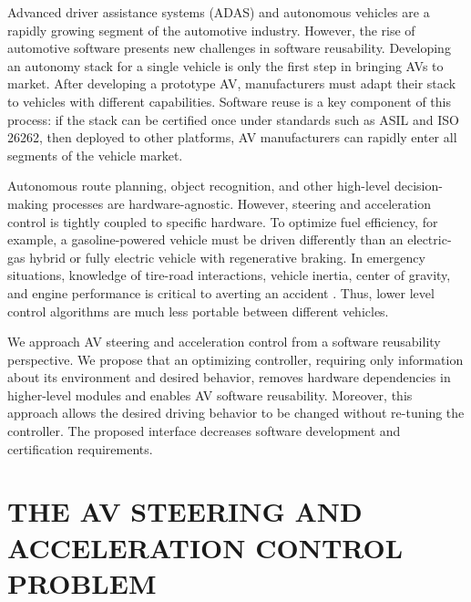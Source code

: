 \documentclass[letterpaper, 10 pt, conference]{ieeeconf}  %
\begin{document}
Advanced driver assistance systems (ADAS) and autonomous vehicles are a rapidly growing segment of the automotive industry. However, the rise of automotive software presents new challenges in software reusability.
Developing an autonomy stack for a single vehicle is only the first step in bringing AVs to market. After developing a prototype AV, manufacturers must adapt their stack to vehicles with different capabilities. Software reuse is a key component of this process: if the stack can be certified once under standards such as ASIL and ISO 26262, then deployed to other platforms, AV manufacturers can rapidly enter all segments of the vehicle market.

Autonomous route planning, object recognition, and other high-level decision-making processes are hardware-agnostic. However, steering and acceleration control is tightly coupled to specific hardware. To optimize fuel efficiency, for example, a gasoline-powered vehicle must be driven differently than an electric-gas hybrid or fully electric vehicle with regenerative braking. In emergency situations, knowledge of tire-road interactions, vehicle inertia, center of gravity, and engine performance is critical to averting an accident \cite{beal}. Thus, lower level control algorithms are much less portable between different vehicles.

We approach AV steering and acceleration control from a software reusability perspective. We propose that an optimizing controller, requiring only information about its environment and desired behavior, removes hardware dependencies in higher-level modules and enables AV software reusability. Moreover, this approach allows the desired driving behavior to be changed without re-tuning the controller. The proposed interface decreases software development and certification requirements.


\section{THE AV STEERING AND ACCELERATION CONTROL PROBLEM}
\end{document}
